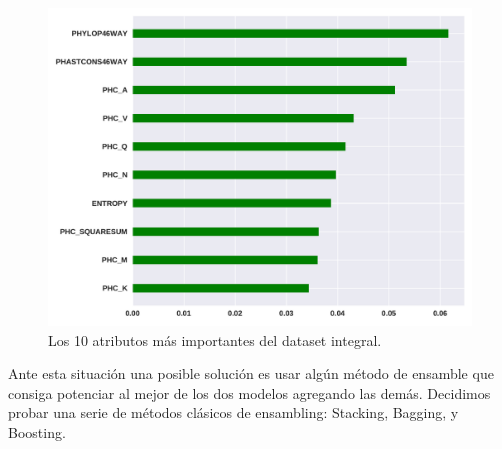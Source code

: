 \begin{figure}[H]
    \centering
    \includegraphics[scale=0.55]{documents/latex/figures/3/importance_3.pdf}
    \caption{Los 10 atributos más importantes del dataset integral.}
    \label{fig:importance_3}
\end{figure}

Ante esta situación una posible solución es usar algún método de ensamble que consiga potenciar al mejor de los dos modelos agregando las demás. Decidimos probar una serie de métodos clásicos de ensambling: Stacking, Bagging, y Boosting.






